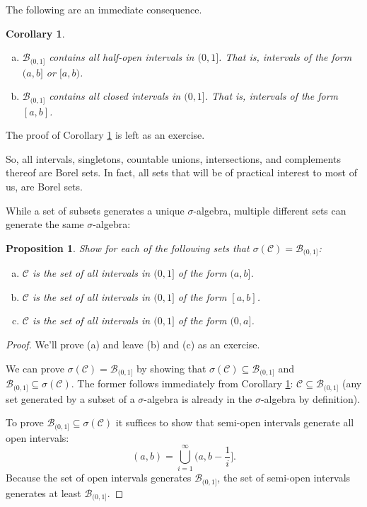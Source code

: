 \documentclass{book}
\theoremstyle{plain}%
\newtheorem{corollary}{Corollary}[section]
\newtheorem{proposition}{Proposition}[section]
\theoremstyle{definition}
\begin{document}
The following are an immediate consequence.

\begin{corollary}
\text{ }
\begin{enumerate}[(a)]
\item $\mathcal{B}_{(0,1]}$ contains all half-open intervals in $(0,1]$. That is, intervals of the form $(a,b]$ or $[a,b)$.
\item $\mathcal{B}_{(0,1]}$ contains all closed intervals in $(0,1]$. That is, intervals of the form $[a,b]$.
\end{enumerate}
\label{prop:borel_sets}
\end{corollary}

The proof of Corollary \ref{prop:borel_sets} is left as an exercise.

So, all intervals, singletons, countable unions, intersections, and complements thereof are Borel sets. In fact, all sets that will be of practical interest to most of us, are Borel sets.

While a set of subsets generates a unique $\sigma$-algebra, multiple different sets can generate the same $\sigma$-algebra:


\begin{proposition}
Show for each of the following sets that $\sigma(\mathcal{C}) = \mathcal{B}_{(0,1]}$:
\begin{enumerate}[(a)]
\item $\mathcal{C}$ is the set of all intervals in $(0,1]$ of the form $(a,b]$.
\item $\mathcal{C}$ is the set of all intervals in $(0,1]$ of the form $[a,b]$.
\item $\mathcal{C}$ is the set of all intervals in $(0,1]$ of the form $(0,a]$.
\end{enumerate}\label{prop:generateborel}
\end{proposition}

\begin{proof}
We'll prove (a) and leave (b) and (c) as an exercise.

We can prove $\sigma(\mathcal{C}) = \mathcal{B}_{(0,1]}$ by showing that $\sigma(\mathcal{C}) \subseteq \mathcal{B}_{(0,1]}$ and $\mathcal{B}_{(0,1]} \subseteq \sigma(\mathcal{C})$. The former follows immediately from Corollary \ref{prop:borel_sets}: $\mathcal{C} \subseteq \mathcal{B}_{(0,1]}$ (any set generated by a subset of a $\sigma$-algebra is already in the $\sigma$-algebra by definition).

To prove $\mathcal{B}_{(0,1]} \subseteq \sigma(\mathcal{C})$ it suffices to show that semi-open intervals generate all open intervals:
$$(a,b) = \displaystyle\bigcup_{i=1}^\infty (a,b-\frac{1}{i}].$$
Because the set of open intervals generates $\mathcal{B}_{(0,1]}$, the set of semi-open intervals generates at least $\mathcal{B}_{(0,1]}$. 
\end{proof}
\end{document}

